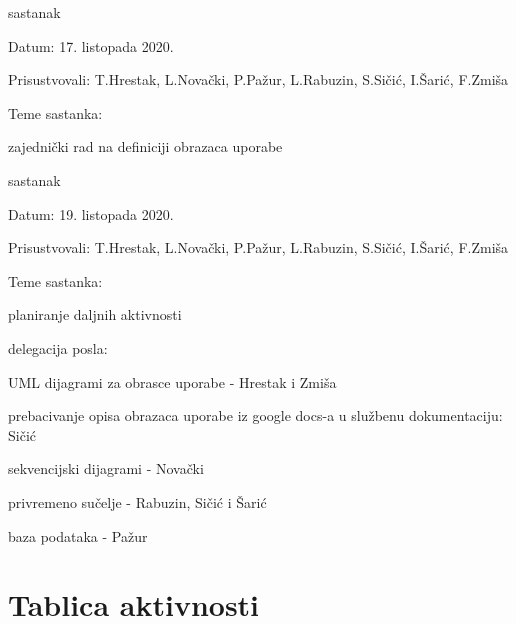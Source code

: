 \begin{packed_enum}
			\item  sastanak
			
			\item[] \begin{packed_item}
				\item Datum: 17. listopada 2020.
				\item Prisustvovali: T.Hrestak, L.Novački, P.Pažur, L.Rabuzin, S.Sičić, I.Šarić, F.Zmiša
				\item Teme sastanka:
				\begin{packed_item}
					\item  zajednički rad na definiciji obrazaca uporabe
				\end{packed_item}
			\end{packed_item}
		
			\item  sastanak
			
			\item[] \begin{packed_item}
				\item Datum: 19. listopada 2020.
				\item Prisustvovali: T.Hrestak, L.Novački, P.Pažur, L.Rabuzin, S.Sičić, I.Šarić, F.Zmiša
				\item Teme sastanka:
				\begin{packed_item}
					\item  planiranje daljnih aktivnosti
					\item  delegacija posla:
					\begin{packed_item}
						\item  UML dijagrami za obrasce uporabe - Hrestak i Zmiša
						\item  prebacivanje opisa obrazaca uporabe iz google docs-a u službenu dokumentaciju: Sičić
						\item  sekvencijski dijagrami - Novački
						\item  privremeno sučelje - Rabuzin, Sičić i Šarić
						\item  baza podataka - Pažur
					\end{packed_item}
				\end{packed_item}
			\end{packed_item}
			
			
		\end{packed_enum}
		
		\eject
		\section*{Tablica aktivnosti}
		
